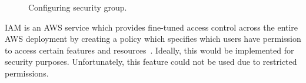\begin{figure}[!htbp]
    \centering
    \hfill
    \hfill
    \hfill
    \caption{Configuring security group.}
    \label{fig:security-groups}
\end{figure}

\clearpage
IAM is an AWS service which provides fine-tuned access control across the entire AWS deployment by creating a policy
which specifies which users have permission to access certain features and resources~\parencite{amazon2022aws2}.
Ideally, this would be implemented for security purposes.
Unfortunately, this feature could not be used due to restricted permissions.

